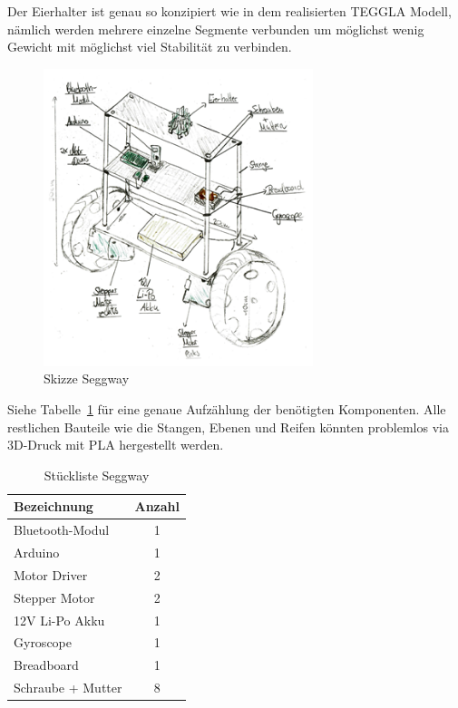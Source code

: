 Der Eierhalter ist genau so konzipiert wie in dem realisierten TEGGLA Modell, nämlich werden mehrere einzelne Segmente verbunden um möglichst wenig Gewicht mit möglichst viel Stabilität zu verbinden.

\begin{figure}[!ht]
	\centering
	\includegraphics[width=0.7\textwidth]{bilder/seggway.png}
	\caption{Skizze Seggway}
	\label{bild:seggway}
\end{figure}

Siehe Tabelle~\ref{table:seggway} für eine genaue Aufzählung der benötigten Komponenten. 
Alle restlichen Bauteile wie die Stangen, Ebenen und Reifen könnten problemlos via 3D-Druck mit PLA hergestellt werden.

\begin{table}[!ht]
	\centering
\begin{tabular}{lc}
	Bezeichnung & Anzahl \\
	\midrule[2pt]
	Bluetooth-Modul & 1\\
	\midrule
	Arduino & 1 \\
	\midrule
	Motor Driver & 2 \\
	\midrule
	Stepper Motor & 2 \\
	\midrule
	12V Li-Po Akku & 1 \\
	\midrule
	Gyroscope & 1 \\
	\midrule
	Breadboard & 1 \\
	\midrule
	Schraube + Mutter & 8 \\

\end{tabular} 
\caption{Stückliste Seggway} 
\label{table:seggway}
\end{table} 


